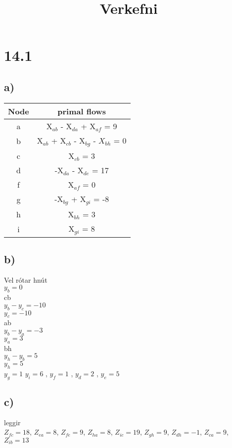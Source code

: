 \documentclass[]{article}
\begin{document}
\title{Verkefni}
\author{}
\maketitle


\section*{14.1}

\subsection*{a)}

\begin{tabular}{ |c |c| }
 \hline 
 Node &  primal flows \\
 \hline
 a & X$ _{ab}$ - X$ _{da}$ + X$ _{af}$ = 9 \\  \hline
 b & X$ _{ab} $ + X$ _{cb} $ - X$ _{bg} $ - $ X_{bh} $ = 0 \\ \hline
 c & X$ _{cb} $ = 3 \\ \hline
 d & -X$ _{da} $ - X$ _{de} $ = 17 \\ \hline
 f & X$ _{af} $ = 0 \\ \hline
 g & -X$ _{bg} $ + X$ _{gi} $ = -8 \\ \hline
 h & X$ _{bh} $ = 3 \\ \hline
 i & X$ _{gi} $ = 8 \\ \hline
\end{tabular}

\subsection*{b)}

Vel rótar hnút\\
$y_{b} = 0$ \\
cb \\
$y_{b} - y_{c} = -10 $\\
$y_{c} = -10 $ \\
ab \\
$y_{b} - y_{a} = -3 $ \\
$ y_{a} = 3 $ \\
bh \\
$y_{h} - y_{b} = 5$ \\
$ y_{h} = 5 $ \\
$y_{g} = 1$ 
$y_{i} = 6$ ,
$y_{f} = 1$ ,
$y_{d} = 2$ ,
$y_{e} = 5$

\subsection*{c)}
leggir \\
$Z_{fc} = 18$, 
$Z_{ea} = 8$,
$Z_{fe} = 9$,  
$Z_{ha} = 8$,
$Z_{ic} = 19$, 
$Z_{gh} = 9$,
$Z_{dh} = -1$,   
$Z_{ca} = 9$,
$Z_{ib} = 13$
\end{document}
